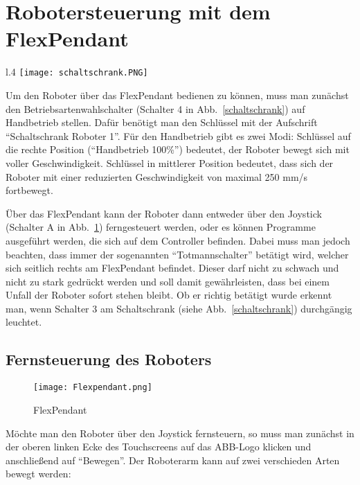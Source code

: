 \section{Robotersteuerung mit dem FlexPendant}
\label{flexsection}
\begin{wrapfigure}{l}{.4\textwidth}
\centering
\texttt{[image: schaltschrank.PNG]}
\vspace{-15pt}
\caption{Schaltschrank} 
\label{schaltschrank}
\end{wrapfigure}

Um den Roboter über das FlexPendant bedienen zu können, muss man zunächst den Betriebsartenwahlschalter (Schalter 4 in Abb.~\ref{schaltschrank}) auf Handbetrieb stellen. Dafür benötigt man den Schlüssel mit der Aufschrift \enquote{Schaltschrank Roboter 1}. Für den Handbetrieb gibt es zwei Modi: Schlüssel auf die rechte Position (\enquote{Handbetrieb 100\%}) bedeutet, der Roboter bewegt sich mit voller Geschwindigkeit. Schlüssel in mittlerer Position bedeutet, dass sich der Roboter mit einer reduzierten Geschwindigkeit von maximal 250 mm/s fortbewegt.

Über das FlexPendant kann der Roboter dann entweder über den Joystick (Schalter A in Abb.~\ref{flexpendant}) ferngesteuert werden, oder es können Programme ausgeführt werden, die sich auf dem Controller befinden. Dabei muss man jedoch beachten, dass immer der sogenannten \enquote{Totmannschalter} betätigt wird, welcher sich seitlich rechts am FlexPendant befindet. Dieser darf nicht zu schwach und nicht zu stark gedrückt werden und soll damit gewährleisten, dass bei einem Unfall der Roboter sofort stehen bleibt. Ob er richtig betätigt wurde erkennt man, wenn Schalter 3 am Schaltschrank (siehe Abb.~\ref{schaltschrank}) durchgängig leuchtet. 

\subsection{Fernsteuerung des Roboters}

\begin{figure}[htbp]
\centering
\texttt{[image: Flexpendant.png]}
\caption{FlexPendant} 
\label{flexpendant}
\end{figure}

Möchte man den Roboter über den Joystick fernsteuern, so muss man zunächst in der oberen linken Ecke des Touchscreens auf das ABB-Logo klicken und anschließend auf \enquote{Bewegen}. Der Roboterarm kann auf zwei verschieden Arten bewegt werden:

